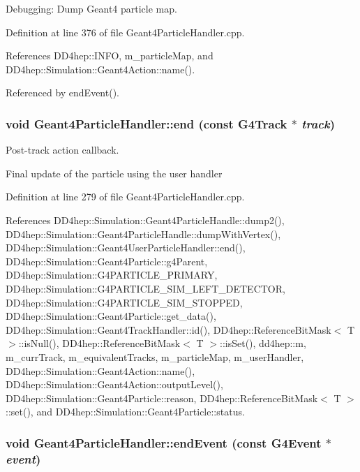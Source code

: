 Debugging: Dump Geant4 particle map. 

Definition at line 376 of file Geant4ParticleHandler.cpp.

References DD4hep::INFO, m\_\-particleMap, and DD4hep::Simulation::Geant4Action::name().

Referenced by endEvent().\hypertarget{class_d_d4hep_1_1_simulation_1_1_geant4_particle_handler_a6983068cd3f90fb922cb89378a85770e}{
\subsubsection[{end}]{\setlength{\rightskip}{0pt plus 5cm}void Geant4ParticleHandler::end (const G4Track $\ast$ {\em track})}}
\label{class_d_d4hep_1_1_simulation_1_1_geant4_particle_handler_a6983068cd3f90fb922cb89378a85770e}


Post-\/track action callback. 

Final update of the particle using the user handler 

Definition at line 279 of file Geant4ParticleHandler.cpp.

References DD4hep::Simulation::Geant4ParticleHandle::dump2(), DD4hep::Simulation::Geant4ParticleHandle::dumpWithVertex(), DD4hep::Simulation::Geant4UserParticleHandler::end(), DD4hep::Simulation::Geant4Particle::g4Parent, DD4hep::Simulation::G4PARTICLE\_\-PRIMARY, DD4hep::Simulation::G4PARTICLE\_\-SIM\_\-LEFT\_\-DETECTOR, DD4hep::Simulation::G4PARTICLE\_\-SIM\_\-STOPPED, DD4hep::Simulation::Geant4Particle::get\_\-data(), DD4hep::Simulation::Geant4TrackHandler::id(), DD4hep::ReferenceBitMask$<$ T $>$::isNull(), DD4hep::ReferenceBitMask$<$ T $>$::isSet(), dd4hep::m, m\_\-currTrack, m\_\-equivalentTracks, m\_\-particleMap, m\_\-userHandler, DD4hep::Simulation::Geant4Action::name(), DD4hep::Simulation::Geant4Action::outputLevel(), DD4hep::Simulation::Geant4Particle::reason, DD4hep::ReferenceBitMask$<$ T $>$::set(), and DD4hep::Simulation::Geant4Particle::status.\hypertarget{class_d_d4hep_1_1_simulation_1_1_geant4_particle_handler_a6b0ac9f15f1c1280ad81ddc1faf3d417}{
\subsubsection[{endEvent}]{\setlength{\rightskip}{0pt plus 5cm}void Geant4ParticleHandler::endEvent (const G4Event $\ast$ {\em event})}}
\label{class_d_d4hep_1_1_simulation_1_1_geant4_particle_handler_a6b0ac9f15f1c1280ad81ddc1faf3d417}


